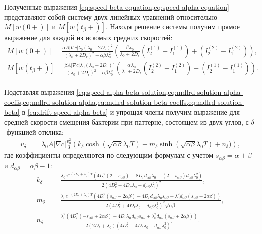 Полученные выражения \cref{eq:speed-beta-equation,eq:speed-alpha-equation} представляют собой систему двух линейных уравнений относительно $M[w(0+)]$ и $M[w(t_{\beta}+)]$. Находя решение системы получим прямое выражение для каждой из искомых средних скоростей:
\begin{equation}
    \begin{aligned}
        M[w(0+)] = \frac{\alpha A |\nabla c|\lambda_0 (\lambda_0+2D_r)^2}{(\lambda_0+2D_r)^2-\alpha\beta\lambda_0^2} \left ( \frac{\beta \lambda_0}{\lambda_0+2D_r}(I_2^{(1)} - I_1^{(1)}) + (I_2^{(2)} - I_1^{(2)})\right ), \\
        M[w(t_{\beta}+)] = \frac{\beta A |\nabla c|\lambda_0 (\lambda_0+2D_r)^2}{(\lambda_0+2D_r)^2-\alpha\beta\lambda_0^2} \left ( \frac{\alpha \lambda_0}{\lambda_0+2D_r}(I_2^{(2)} - I_1^{(2)}) + (I_2^{(1)} - I_1^{(1)})\right ). \\
        \label{eq:speed-alpha-beta-solution}
    \end{aligned}
\end{equation}

Подставляя выражения \cref{eq:speed-alpha-beta-solution,eq:mdlrd-solution-alpha-coeffs,eq:mdlrd-solution-alpha,eq:mdlrd-solution-beta-coeffs,eq:mdlrd-solution-beta} в \cref{eq:drift-speed-alpha-beta} и упрощая члены получим выражение для средней скорости смещения бактерии при паттерне, состоящем из двух углов, с $\delta$-функцией отклика:
\begin{equation}
    \begin{aligned}
        v_{\delta}&=\lambda_0 A |\nabla c| \frac{v_0^2}{3} \left ( k_{\delta} \cosh(\sqrt{\alpha \beta} \lambda_0 T) + m_{\delta} \sinh(\sqrt{\alpha \beta} \lambda_0 T) + n_{\delta}) \right ),
        \label{eq:mean-displacement-delta-response-solution}
    \end{aligned}
\end{equation}
где коэффициенты определяются по следующим формулам с учетом $s_{\alpha\beta}=\alpha+\beta$ и $d_{\alpha\beta}=\alpha\beta-1$:
\begin{equation}
    \begin{aligned}
        k_{\delta}&=\frac{\lambda_0 e^{-(2D_r+\lambda_0)T}(4D_r^2(2-s_{\alpha\beta})-8D_r d_{\alpha\beta}\lambda_0-(2+s_{\alpha\beta})d_{\alpha\beta}\lambda_0^2)}{2(4D_r^2+4D_r\lambda_0-d_{\alpha\beta}\lambda_0^2)^2}, \\
        m_{\delta}&=\frac{\lambda_0 e^{-(2D_r+\lambda_0)T}(4D_r^2(s_{\alpha\beta}-2\alpha\beta)-4D_rd_{\alpha\beta}\lambda_0s_{\alpha\beta}-\lambda_0^2d_{\alpha\beta}(s_{\alpha\beta}+2\alpha\beta))}{2(4D_r^2+4D_r\lambda_0-d_{\alpha\beta}\lambda_0^2)^2\sqrt{\alpha\beta}}, \\
        n_{\delta}&=\frac{\lambda_0^2 (4D_r^2(-s_{\alpha\beta}+2\alpha\beta)+4D_r\lambda_0d_{\alpha\beta}s_{\alpha\beta}+\lambda_0^2d_{\alpha\beta}(s_{\alpha\beta}+2\alpha\beta))}{2(2D_r+\lambda_0)(4D_r^2+4D_r\lambda_0-d_{\alpha\beta}\lambda_0^2)^2}. \\
        \label{eq:mddrs-coeffs}
    \end{aligned}
\end{equation}

